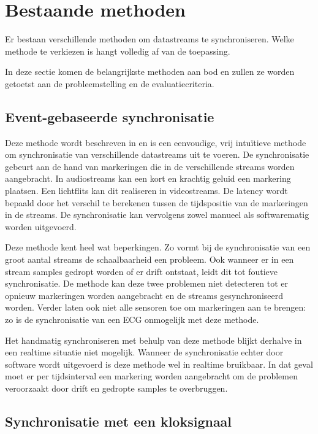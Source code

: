 \section{Bestaande methoden}
\label{bestaande-methoden}

Er bestaan verschillende methoden om datastreams te synchroniseren. Welke methode te verkiezen is hangt volledig af van de toepassing.

In deze sectie komen de belangrijkste methoden aan bod en zullen ze worden getoetst aan de probleemstelling en de evaluatiecriteria.

\subsection{Event-gebaseerde synchronisatie}

Deze methode wordt beschreven in \cite{bannach2009automatic, six2015multimodal} en is een eenvoudige, vrij intuïtieve methode om synchronisatie van verschillende datastreams uit te voeren. De synchronisatie gebeurt aan de hand van markeringen die in de verschillende streams worden aangebracht. In audiostreams kan een kort en krachtig geluid een markering plaatsen. Een lichtflits kan dit realiseren in videostreams. De latency wordt bepaald door het verschil te berekenen tussen de tijdspositie van de markeringen in de streams. De synchronisatie kan vervolgens zowel manueel als softwarematig worden uitgevoerd.

Deze methode kent heel wat beperkingen. Zo vormt bij de synchronisatie van een groot aantal streams de schaalbaarheid een probleem. Ook wanneer er in een stream samples gedropt worden of er drift ontstaat, leidt dit tot foutieve synchronisatie. De methode kan deze twee problemen niet detecteren tot er opnieuw markeringen worden aangebracht en de streams gesynchroniseerd worden. Verder laten ook niet alle sensoren toe om markeringen aan te brengen: zo is de synchronisatie van een ECG onmogelijk met deze methode.

Het handmatig synchroniseren met behulp van deze methode blijkt derhalve in een realtime situatie niet mogelijk.  Wanneer de synchronisatie echter door software wordt uitgevoerd is deze methode wel in realtime bruikbaar. In dat geval moet er per tijdsinterval een markering worden aangebracht om de problemen veroorzaakt door drift en gedropte samples te overbruggen.

\subsection{Synchronisatie met een kloksignaal}

